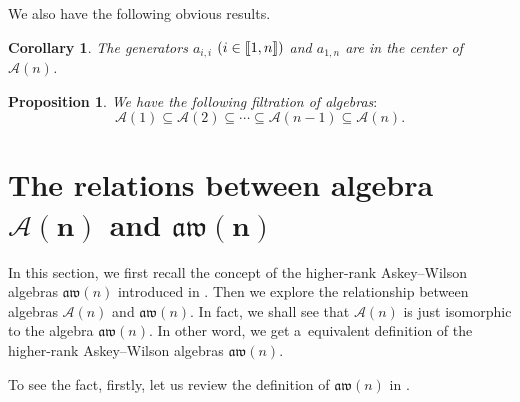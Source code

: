 \documentclass[pdftex]{sigma}
\numberwithin{equation}{section}
\def\A{\mathscr{A}}
\def\aw{\mathfrak{aw}}
\def\lbb#1{\left[\kern-0.15em\left[ {#1} \right] \kern-0.15em\right]}
\newtheorem{Corollary}[Theorem]{Corollary}
\newtheorem{Proposition}[Theorem]{Proposition}
 { \theoremstyle{definition}
\newtheorem{Definition}[Theorem]{Definition}
\newtheorem{Note}[Theorem]{Note}
\newtheorem{Example}[Theorem]{Example}
\newtheorem{Remark}[Theorem]{Remark} }
\begin{document}
We also have the following obvious results.
\begin{Corollary}
The generators $a_{i, i}$ $(i \in \lbb{1,n})$ and $ a_{1, n}$ are in the center of $\A(n)$.
\end{Corollary}

\begin{Proposition} We have the following filtration of algebras$:$
\begin{equation*}
\A(1) \subseteq \A(2) \subseteq \cdots \subseteq \A(n-1) \subseteq \A(n).
\end{equation*}
\end{Proposition}

\section[The relations between algebra A(n) and aw(n)]{The relations between algebra $\boldsymbol{\A(n)}$ and $\boldsymbol{\aw(n)}$}\label{sect:relations}
In this section, we first recall the concept of the higher-rank Askey--Wilson algebras $\aw(n)$ introduced in \cite{CFPR(2023)}.
Then we explore the relationship between algebras $\A(n)$ and $\aw(n)$.
In fact, we shall see that $\A(n)$ is just isomorphic to the algebra $\aw(n)$.
In other word, we get a~equivalent definition of the higher-rank Askey--Wilson algebras $\aw(n)$.

To see the fact, firstly, let us review the definition of $\aw(n)$ in \cite{CFPR(2023)}.
\end{document}
